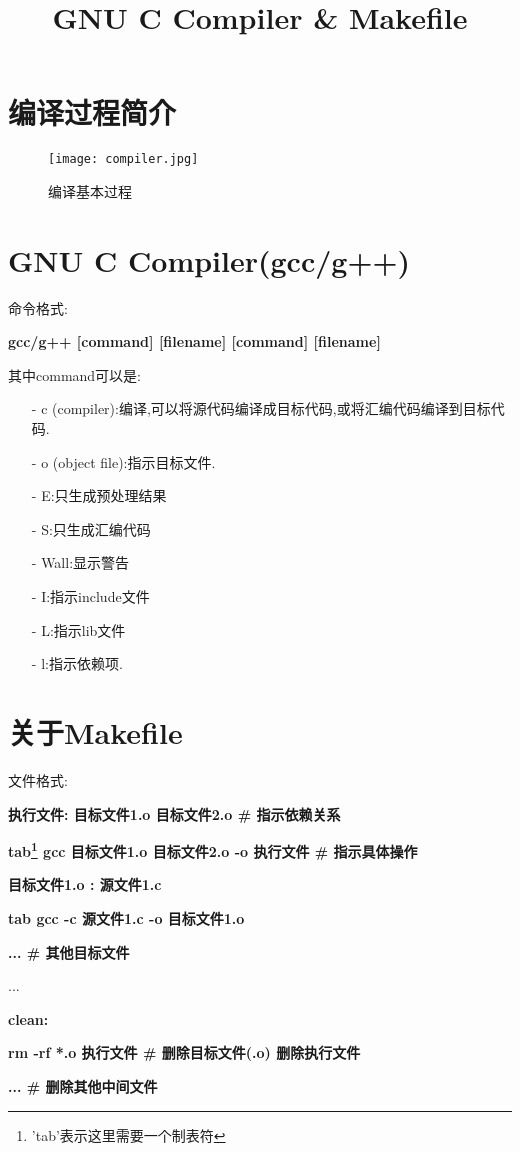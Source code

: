 \documentclass{ctexrep}
\begin{document}
\title{GNU C Compiler \& Makefile}
\author{ }
\maketitle


\section{编译过程简介}

\begin{figure}[hbt]
	\centering
    \texttt{[image: compiler.jpg]}
    \caption{编译基本过程}
    \label{编译过程框图}
\end{figure}

\section{GNU C Compiler(gcc/g++)}
命令格式:\par
    \textbf{gcc/g++ [command] [filename] [command] [filename]}

其中command可以是:
\begin{itemize}
    \item [-]c (compiler):编译,可以将源代码编译成目标代码,或将汇编代码编译到目标代码.
    \item [-]o (object file):指示目标文件.
    \item [-]E:只生成预处理结果
    \item [-]S:只生成汇编代码
    \item [-]Wall:显示警告
    \item [-]I:指示include文件
    \item [-]L:指示lib文件
    \item [-]l:指示依赖项.
\end{itemize}


\section{关于Makefile}

文件格式:\par
	\textbf{执行文件: 目标文件1.o 目标文件2.o \# 指示依赖关系}\par
	\textbf{\qquad tab\footnote{'tab'表示这里需要一个制表符} gcc 目标文件1.o 目标文件2.o -o 执行文件 \# 指示具体操作}\par
	\textbf{目标文件1.o : 源文件1.c}\par
    \textbf{\qquad tab gcc -c 源文件1.c -o 目标文件1.o}\par
	\textbf{... \# 其他目标文件}\par
		\qquad...\par
	\textbf{clean:}\par
	\textbf{\qquad rm -rf *.o 执行文件 \# 删除目标文件(.o) 删除执行文件}\par
	\textbf{\qquad ... \# 删除其他中间文件}\par
\end{document}
